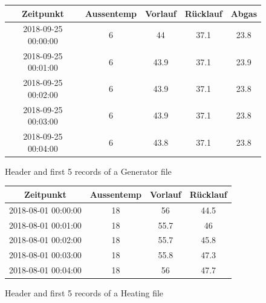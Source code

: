\documentclass[bachelor,english]{info1thesis}
\begin{document}
\begin{figure}
	\begin{center}
		\begin{tabular}{||c c c c c||} 
			\hline
			Zeitpunkt & Aussentemp & Vorlauf & Rücklauf & Abgas \\ [0.5ex] 
			\hline\hline
			2018-09-25 00:00:00 & 6 & 44 & 37.1 & 23.8 \\ 
			\hline
			2018-09-25 00:01:00 & 6 & 43.9 & 37.1 & 23.9 \\
			\hline
			2018-09-25 00:02:00 & 6 & 43.9 & 37.1 & 23.8 \\
			\hline
			2018-09-25 00:03:00 & 6 & 43.9 & 37.1 & 23.8 \\
			\hline
			2018-09-25 00:04:00 & 6 & 43.8 & 37.1 & 23.8 \\ [1ex] 
			\hline
		\end{tabular}
	\end{center}
	\caption{Header and first 5 records of a Generator file}
	\label{table:generator}
		\vspace{0.2cm}
\end{figure}

\begin{figure}
	\begin{center}
		\begin{tabular}{||c c c c||} 
			\hline
			Zeitpunkt & Aussentemp & Vorlauf & Rücklauf \\ [0.5ex] 
			\hline\hline
			2018-08-01 00:00:00 & 18 & 56 & 44.5 \\ 
			\hline
			2018-08-01 00:01:00 & 18 & 55.7 & 46 \\
			\hline
			2018-08-01 00:02:00 & 18 & 55.7 & 45.8 \\
			\hline
			2018-08-01 00:03:00 & 18 & 55.8 & 47.3 \\
			\hline
			2018-08-01 00:04:00 & 18 & 56 & 47.7 \\ [1ex] 
			\hline
		\end{tabular}
	\end{center}
	\caption{Header and first 5 records of a Heating file}
	\label{table:heating}
		\vspace{0.2cm}
\end{figure}
\end{document}
